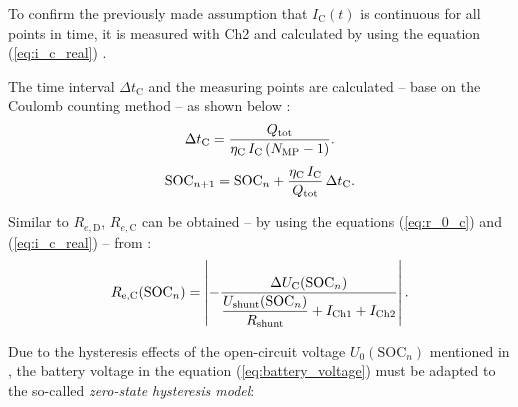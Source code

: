 To confirm the previously made assumption that $I_{\mathrm C}(t)$ is continuous for all points in time, it is measured with Ch2 and calculated by using the equation (\ref{eq:i_c_real}) \cite{Notten:2005, Mertens:2015, Sterner:2017, Kurzweil:2018, Liu:2020}. 

The time interval $\Delta t_{\mathrm{C}}$ and the measuring points are calculated -- base on the Coulomb counting method -- as shown below \cite{He:2011, Wehbe:2015, Nejad:2016, Kurzweil:2018, Li:2018}:
\begin{equation} \label{eq:delta_t_C}
	\centering
	\Delta t_{\mathrm{C}} = \dfrac{ Q_\mathrm{tot}}{\eta_\mathrm{C} \, I_\mathrm{C} \left( N_\mathrm{MP} - 1 \right)} \text{.}
\end{equation}
\begin{equation} \label{eq:SOC_n_plus_1}
	\centering
	\mathrm{SOC}_{n + 1} = \mathrm{SOC}_{n} + \dfrac{\eta_\mathrm{C} \, I_\mathrm{C}}{Q_\mathrm{tot}} \, \Delta t_{\mathrm{C}} \text{.}
\end{equation}

Similar to $R_{e,\mathrm{D}}$, $R_{e,\mathrm{C}}$ can be obtained -- by using the equations (\ref{eq:r_0_c}) and (\ref{eq:i_c_real}) -- from \cite{Rahmoun:2012, Hentunen:2014, Kurzweil:2018, Gurjer:2019}:
\begin{equation}\label{eq:r_0_c_soc}
	\centering
	R_{\mathrm{e,C}}(\mathrm{SOC}_n) = \left|-\dfrac{\Delta U_{\mathrm C}(\mathrm{SOC}_n)}{\dfrac{U_\mathrm{shunt}(\mathrm{SOC}_n)}{R_\mathrm{shunt}} + I_\mathrm{Ch1} + I_\mathrm{Ch2}}\right| \text{.}
\end{equation}

Due to the hysteresis effects of the open-circuit voltage $U_0(\mathrm{SOC}_n)$ mentioned in \cite{Hentunen:2014, Wehbe:2015, Gurjer:2019, Saldana:2019}, the battery voltage in the equation (\ref{eq:battery_voltage}) must be adapted to the so-called \emph{zero-state hysteresis model}:

